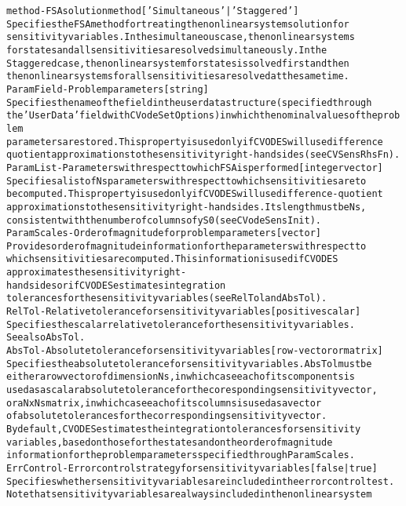 \begin{alltt}
method - FSA solution method [ 'Simultaneous' | {'Staggered'} ]
   Specifies the FSA method for treating the nonlinear system solution for
   sensitivity variables. In the simultaneous case, the nonlinear systems
   for states and all sensitivities are solved simultaneously. In the
   Staggered case, the nonlinear system for states is solved first and then
   the nonlinear systems for all sensitivities are solved at the same time.
ParamField - Problem parameters  [ string ]
   Specifies the name of the field in the user data structure (specified through
   the 'UserData' field with CVodeSetOptions) in which the nominal values of the problem
   parameters are stored. This property is used only if  CVODES will use difference
   quotient approximations to the sensitivity right-hand sides (see CVSensRhsFn).
ParamList - Parameters with respect to which FSA is performed [ integer vector ]
   Specifies a list of Ns parameters with respect to which sensitivities are to
   be computed. This property is used only if CVODES will use difference-quotient
   approximations to the sensitivity right-hand sides. Its length must be Ns,
   consistent with the number of columns of yS0 (see CVodeSensInit).
ParamScales - Order of magnitude for problem parameters [ vector ]
   Provides order of magnitude information for the parameters with respect to
   which sensitivities are computed. This information is used if CVODES
   approximates the sensitivity right-hand sides or if CVODES estimates integration
   tolerances for the sensitivity variables (see RelTol and AbsTol).
RelTol - Relative tolerance for sensitivity variables [ positive scalar ]
   Specifies the scalar relative tolerance for the sensitivity variables.
   See also AbsTol.
AbsTol - Absolute tolerance for sensitivity variables [ row-vector or matrix ]
   Specifies the absolute tolerance for sensitivity variables. AbsTol must be
   either a row vector of dimension Ns, in which case each of its components is
   used as a scalar absolute tolerance for the coresponding sensitivity vector,
   or a N x Ns matrix, in which case each of its columns is used as a vector
   of absolute tolerances for the corresponding sensitivity vector.
   By default, CVODES estimates the integration tolerances for sensitivity
   variables, based on those for the states and on the order of magnitude
   information for the problem parameters specified through ParamScales.
ErrControl - Error control strategy for sensitivity variables [ false | {true} ]
   Specifies whether sensitivity variables are included in the error control test.
   Note that sensitivity variables are always included in the nonlinear system

\end{alltt}
